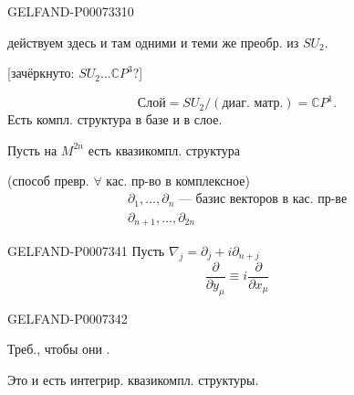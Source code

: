 \begin{GelfandAdjacentEvidence}{GELFAND-P000733}{10}

действуем здесь и там одними и теми же преобр. из \(SU_2\).

[зачёркнуто: \(SU_2\ldots\mathbb C P^3\)?]
\end{GelfandAdjacentEvidence}


\[
\text{Слой}=SU_2/(\text{диаг. матр.})=\mathbb C P^1.
\]
Есть компл. структура в базе и в слое.

Пусть на \(M^{2n}\) есть квазикомпл. структура

(способ превр. \(\forall\) кас. пр-во в комплексное)
\[
\begin{gathered}
\partial_1,\ldots,\partial_n\text{ --- базис векторов в кас. пр-ве}\\
\partial_{n+1},\ldots,\partial_{2n}
\end{gathered}
\]


\begin{GelfandAdjacentEvidence}{GELFAND-P000734}{1}
Пусть \(\nabla_j=\partial_j+i\partial_{n+j}\)
\[
\frac{\partial}{\partial y_\mu}\equiv i\frac{\partial}{\partial x_\mu}
\]
\end{GelfandAdjacentEvidence}
\begin{GelfandAdjacentEvidence}{GELFAND-P000734}{2}

Треб., чтобы они .

Это и есть интегрир. квазикомпл. структуры.
\end{GelfandAdjacentEvidence}



